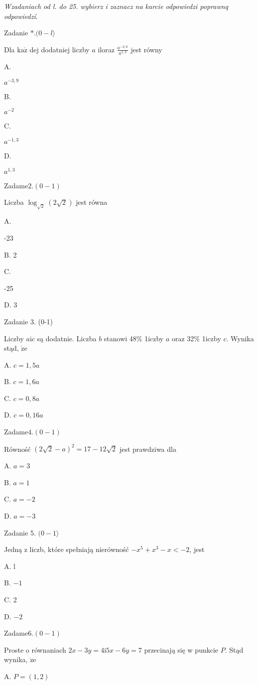 \documentclass[a4paper,12pt]{article}
\begin{document}
{\it Wzadaniach od l. do 25. wybierz i zaznacz na karcie odpowiedzi poprawnq odpowiedzí}.

Zadanie $*.(0-l\rangle$

Dla $\mathrm{k}\mathrm{a}\dot{\mathrm{z}}$ dej dodatniej liczby $a$ iloraz $\displaystyle \frac{a^{-2,6}}{a^{1,3}}$ jest równy

A.

$a^{-3,9}$

B.

$a^{-2}$

C.

$a^{-1,3}$

D.

$a^{1,3}$

Zadam$\mathrm{e}2. (0-1)$

Liczba $\log_{\sqrt{2}}(2\sqrt{2})$ jest równa

A.

-23

B. 2

C.

-25

D. 3

Zadanie 3. (0-1)

Liczby $a\mathrm{i}c$ są dodatnie. Liczba $b$ stanowi 48\% 1iczby $a$ oraz 32\% 1iczby $c$. Wynika stąd, $\dot{\mathrm{z}}\mathrm{e}$

A. $c=1,5a$

B. $c=1,6a$

C. $c=0,8a$

D. $c=0,16a$

Zadam$\mathrm{e}4.(0-1)$

Równość $(2\sqrt{2}-a)^{2}=17-12\sqrt{2}$ jest prawdziwa dla

A. $a=3$

B. $a=1$

C. $a=-2$

D. $a=-3$

Zadanie 5. $(0-1\rangle$

Jedną z liczb, które spełniają nierówność $-x^{5}+x^{3}-x<-2$, jest

A. l

B. $-1$

C. 2

D. $-2$

Zadam$\mathrm{e}6.(0-1)$

Proste o równaniach $2x-3y=4\mathrm{i}5x-6y=7$ przecinają się w punkcie $P$. Stąd wynika, $\dot{\mathrm{z}}\mathrm{e}$

A. $P=(1,2)$
\end{document}
